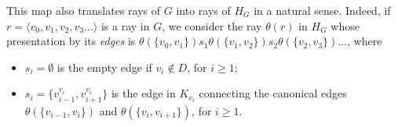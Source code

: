 \documentclass[10pt]{article}
\numberwithin{equation}{subsection}
\theoremstyle{remark}
\begin{document}
This map also translates rays of $G$ into rays of $H_G$ in a natural sense. Indeed, if $r = \langle v_0,v_1,v_2,v_3\dots\rangle$ is a ray in $G$, we consider the ray $\theta(r)$ in $H_G$ whose presentation by its \textit{edges} is $\theta(\lbrace v_0,v_1\rbrace)s_1\theta(\lbrace v_1,v_2\rbrace)s_2\theta(\lbrace v_2, v_3\rbrace)\dots$, where

\begin{itemize}
        \item $s_i =\emptyset$ is the empty edge if $v_i\notin D$, for $i \geq 1$;
        \item $s_i  = \lbrace v_{i-1}^{v_i},v_{i+1}^{v_i}\rbrace$ is the edge in $K_{v_i}$ connecting the canonical edges $\theta(\lbrace v_{i-1}, v_i\rbrace)$ and $\theta(\lbrace v_i,v_{i+1}\rbrace)$, for $i \geq 1$.
    \end{itemize}

\renewcommand{\myrectangle}[5]{
    \draw (#1,#2) rectangle ++ (#3,#4);
    \node[shift = {({-#3*0.5},{0.1*#4})}] at (#1+#3,#2+#4) {\large\textbf{#5}};
}
\end{document}
